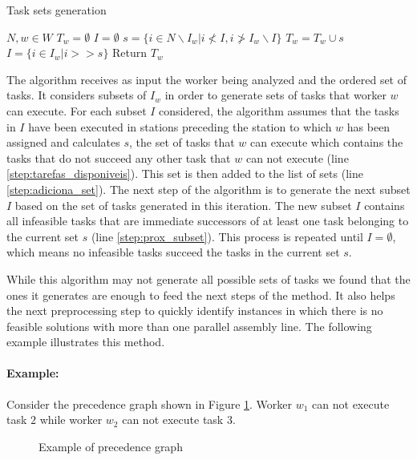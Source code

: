 \documentclass{singlecol-new}
\begin{document}
\begin{algorithm}[!ht]
\caption{Task sets generation}
\label{alg:task_sets_generation}
\begin{algorithmic}[1]
\REQUIRE $ N, w \in W$ 
\STATE $T_w = \emptyset $
\STATE $I = \emptyset$
\REPEAT
		\STATE $s = \{i \in N\backslash I_w | i \not< I, i \not> I_w\backslash I\}$\label{step:tarefas_disponiveis}
		\STATE $T_w = T_w \cup s$\label{step:adiciona_set}
		\STATE $I = \{i \in I_w | i >> s\}$\label{step:prox_subset}
\STATE Return $T_w$
\end{algorithmic}
\end{algorithm}

The algorithm receives as input the worker being analyzed and the ordered set of tasks. It considers subsets of $I_w$ in order to generate sets of tasks that worker $w$ can execute. For each subset $I$ considered, the algorithm assumes that the tasks in $I$ have been executed in stations preceding the station to which $w$ has been assigned and calculates $s$, the set of tasks that $w$ can execute which contains the tasks that do not succeed any other task that $w$ can not execute (line \ref{step:tarefas_disponiveis}). This set is then added to the list of sets (line \ref{step:adiciona_set}). The next step of the algorithm is to generate the next subset $I$ based on the set of tasks generated in this iteration. The new subset $I$ contains all infeasible tasks that are immediate successors of at least one task belonging to the current set $s$ (line \ref{step:prox_subset}). This process is repeated until $I = \emptyset$, which means no infeasible tasks succeed the tasks in the current set $s$.

While this algorithm may not generate all possible sets of tasks we found that the ones it generates are enough to feed the next steps of the method. It also helps the next preprocessing step to quickly identify instances in which there is no feasible solutions with more than one parallel assembly line. The following example illustrates this method.

\paragraph{Example:} Consider the precedence graph shown in Figure \ref{fig:ex_grafo}. Worker $w_1$  can not execute task $2$ while worker $w_2$ can not execute task $3$.

\begin{figure}[!ht]
\centering
{}
\caption{Example of precedence graph}
\label{fig:ex_grafo}
\end{figure}
\end{document}
